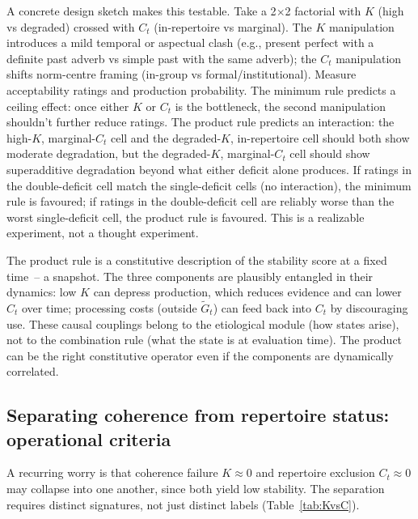 \documentclass[12pt,letterpaper]{article}
\begin{document}
A concrete design sketch makes this testable. Take a 2$\times$2 factorial with $K$ (high vs degraded) crossed with $C_t$ (in-repertoire vs marginal). The $K$ manipulation introduces a mild temporal or aspectual clash (e.g., present perfect with a definite past adverb vs simple past with the same adverb); the $C_t$ manipulation shifts norm-centre framing (in-group vs formal/institutional). Measure acceptability ratings and production probability. The minimum rule predicts a ceiling effect: once either $K$ or $C_t$ is the bottleneck, the second manipulation shouldn't further reduce ratings. The product rule predicts an interaction: the high-$K$, marginal-$C_t$ cell and the degraded-$K$, in-repertoire cell should both show moderate degradation, but the degraded-$K$, marginal-$C_t$ cell should show superadditive degradation beyond what either deficit alone produces. If ratings in the double-deficit cell match the single-deficit cells (no interaction), the minimum rule is favoured; if ratings in the double-deficit cell are reliably worse than the worst single-deficit cell, the product rule is favoured. This is a realizable experiment, not a thought experiment.

The product rule is a constitutive description of the stability score at a fixed time~-- a snapshot. The three components are plausibly entangled in their dynamics: low $K$ can depress production, which reduces evidence and can lower $C_t$ over time; processing costs (outside $\widetilde{G}_t$) can feed back into $C_t$ by discouraging use. These causal couplings belong to the etiological module (how states arise), not to the combination rule (what the state is at evaluation time). The product can be the right constitutive operator even if the components are dynamically correlated.

\subsection{Separating coherence from repertoire status: operational criteria}\label{sec:KvsC}

A recurring worry is that coherence failure $K\approx 0$ and repertoire exclusion $C_t\approx 0$ may collapse into one another, since both yield low stability. The separation requires distinct signatures, not just distinct labels (Table~\ref{tab:KvsC}).
\end{document}
